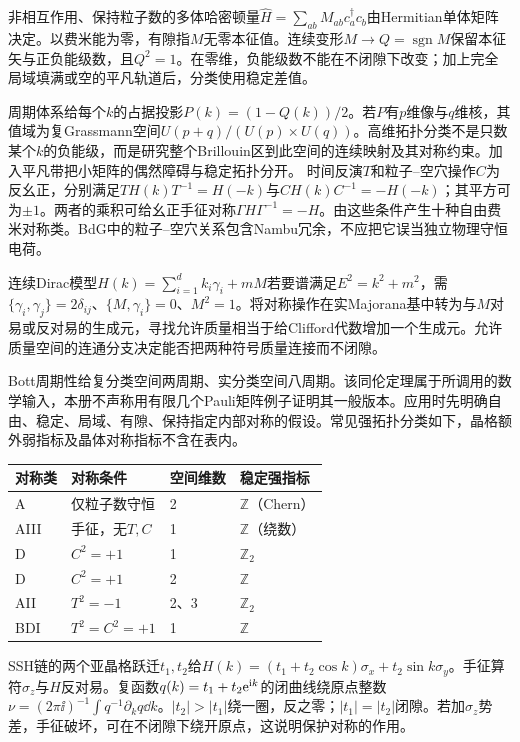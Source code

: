 \label{ch:spt}
非相互作用、保持粒子数的多体哈密顿量$\hat H=\sum_{ab}M_{ab}c_a^\dagger c_b$由Hermitian单体矩阵决定。以费米能为零，有隙指$M$无零本征值。连续变形$M\to Q=\operatorname{sgn}M$保留本征矢与正负能级数，且$Q^2=1$。在零维，负能级数不能在不闭隙下改变；加上完全局域填满或空的平凡轨道后，分类使用稳定差值。

周期体系给每个$k$的占据投影$P(k)=(1-Q(k))/2$。若$P$有$p$维像与$q$维核，其值域为复Grassmann空间$U(p+q)/(U(p)\times U(q))$。高维拓扑分类不是只数某个$k$的负能级，而是研究整个Brillouin区到此空间的连续映射及其对称约束。加入平凡带把小矩阵的偶然障碍与稳定拓扑分开。
时间反演$T$和粒子--空穴操作$C$为反幺正，分别满足$TH(k)T^{-1}=H(-k)$与$CH(k)C^{-1}=-H(-k)$；其平方可为$\pm1$。两者的乘积可给幺正手征对称$\Gamma H\Gamma^{-1}=-H$。由这些条件产生十种自由费米对称类。BdG中的粒子--空穴关系包含Nambu冗余，不应把它误当独立物理守恒电荷。

连续Dirac模型$H(k)=\sum_{i=1}^d k_i\gamma_i+mM$若要谱满足$E^2=k^2+m^2$，需$\{\gamma_i,\gamma_j\}=2\delta_{ij}$、$\{M,\gamma_i\}=0$、$M^2=1$。将对称操作在实Majorana基中转为与$M$对易或反对易的生成元，寻找允许质量相当于给Clifford代数增加一个生成元。允许质量空间的连通分支决定能否把两种符号质量连接而不闭隙。

Bott周期性给复分类空间两周期、实分类空间八周期。该同伦定理属于所调用的数学输入，本册不声称用有限几个Pauli矩阵例子证明其一般版本。应用时先明确自由、稳定、局域、有隙、保持指定内部对称的假设。常见强拓扑分类如下，晶格额外弱指标及晶体对称指标不含在表内。
\begin{center}\begin{tabular}{llll}\toprule 对称类&对称条件&空间维数&稳定强指标\\\midrule
A&仅粒子数守恒&2&$\mathbb Z$（Chern）\\
AIII&手征，无$T,C$&1&$\mathbb Z$（绕数）\\
D&$C^2=+1$&1&$\mathbb Z_2$\\
D&$C^2=+1$&2&$\mathbb Z$\\
AII&$T^2=-1$&2、3&$\mathbb Z_2$\\
BDI&$T^2=C^2=+1$&1&$\mathbb Z$\\\bottomrule\end{tabular}\end{center}
SSH链的两个亚晶格跃迁$t_1,t_2$给$H(k)=(t_1+t_2\cos k)\sigma_x+t_2\sin k\sigma_y$。手征算符$\sigma_z$与$H$反对易。复函数$q(k)=t_1+t_2\mathrm e^{\mathrm i k}$的闭曲线绕原点整数$\nu=(2\pi\ii)^{-1}\int q^{-1}\partial_kq\dd k$。$|t_2|>|t_1|$绕一圈，反之零；$|t_1|=|t_2|$闭隙。若加$\sigma_z$势差，手征破坏，可在不闭隙下绕开原点，这说明保护对称的作用。

